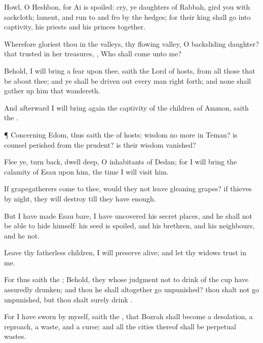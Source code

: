 {Howl, O
Heshbon, for
Ai is
spoiled:
cry, ye
daughters of
Rabbah,
gird you with
sackcloth;
lament, and run to and
fro by the
hedges; for their
king shall
go into
captivity,
{} his
priests and his
princes
together.

Wherefore
gloriest thou in the
valleys, thy
flowing
valley, O
backsliding
daughter? that
trusted in her
treasures,
{}, Who shall
come unto me?

Behold, I will
bring a
fear upon thee,
saith the
Lord
{} of
hosts, from all those that be
about thee; and ye shall be driven
out every
man right
forth; and none shall gather
up him that
wandereth.

And
afterward I will bring
again the
captivity of the
children of
Ammon,
saith the
{}.


\par }{\PP {}¶ Concerning
Edom, thus
saith the
{} of
hosts;
{}
wisdom no more in
Teman? is
counsel
perished from the
prudent? is their
wisdom
vanished?

Flee ye, turn
back,
dwell
deep, O
inhabitants of
Dedan; for I will
bring the
calamity of
Esau upon him, the
time
{} I will
visit him.

If
grapegatherers
come to thee, would they not
leave
{} gleaning
grapes? if
thieves by
night, they will
destroy till they have
enough.

But I have made
Esau
bare, I have
uncovered his secret
places, and he shall not be
able to
hide himself: his
seed is
spoiled, and his
brethren, and his
neighbours, and he
{} not.

Leave thy fatherless
children, I will preserve
{}
alive; and let thy
widows
trust in me.

For thus
saith the
{}; Behold, they whose
judgment
{} not to
drink of the
cup have
assuredly
drunken; and
{} thou he
{} shall
altogether go
unpunished? thou shalt not go
unpunished, but thou shalt
surely
drink
{}.

For I have
sworn by myself,
saith the
{}, that
Bozrah shall become a
desolation, a
reproach, a
waste, and a
curse; and all the
cities thereof shall be
perpetual
wastes.

}

